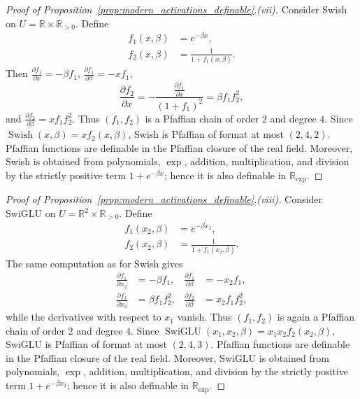 \documentclass{article}
\theoremstyle{plain}
\theoremstyle{definition}
\theoremstyle{remark}
\newcommand{\deriv}[2]{\frac{\partial #1}{\partial #2}}
\theoremstyle{plain}
\numberwithin{thm}{section}
\theoremstyle{definition}
\numberwithin{equation}{section}
\begin{document}
\begin{proof}[{Proof of Proposition~\ref{prop:modern_activations_definable}.(vii)}]
Consider Swish on $U=\mathbb{R}\times\mathbb{R}_{>0}$.  Define
\begin{align*}
    f_1(x,\beta)&=e^{-\beta x},\\
    f_2(x,\beta)&=\frac{1}{1+f_1(x,\beta)}.
\end{align*}
Then
$
    \deriv{f_1}{x}=-\beta f_1
$,
$
    \deriv{f_1}{\beta}=-x f_1
$,
$$
    \deriv{f_2}{x}
    =
        -\frac{\deriv{f_1}{x}}{(1+f_1)^2}
    =
        \beta f_1 f_2^2,
$$
and
$
    \deriv{f_2}{\beta}=x f_1 f_2^2
$.
Thus $(f_1,f_2)$ is a Pfaffian chain of order $2$ and degree $4$.  Since
$
    \operatorname{Swish}(x,\beta)=x f_2(x,\beta)
$,
Swish is Pfaffian of format at most $(2,4,2)$.  Pfaffian functions are definable in the Pfaffian closure of the real field.  Moreover, Swish is obtained from polynomials, $\exp$, addition, multiplication, and division by the strictly positive term $1+e^{-\beta x}$; hence it is also definable in $\mathbb{R}_{\exp}$.
\end{proof}



\begin{proof}[{Proof of Proposition~\ref{prop:modern_activations_definable}.(viii)}]
Consider SwiGLU on $U=\mathbb{R}^2\times\mathbb{R}_{>0}$.  Define
\begin{align*}
    f_1(x_2,\beta) &= e^{-\beta x_2},\\
    f_2(x_2,\beta) &= \frac{1}{1+f_1(x_2,\beta)}.
\end{align*}
The same computation as for Swish gives
\begin{align*}
    \frac{\partial f_1}{\partial x_2} &= -\beta f_1, &
    \frac{\partial f_1}{\partial \beta} &= -x_2 f_1,\\
    \frac{\partial f_2}{\partial x_2} &= \beta f_1 f_2^2, &
    \frac{\partial f_2}{\partial \beta} &= x_2 f_1 f_2^2,
\end{align*}
while the derivatives with respect to $x_1$ vanish.  Thus $(f_1,f_2)$ is again a Pfaffian chain of order $2$ and degree $4$.  Since
$
    \operatorname{SwiGLU}(x_1,x_2,\beta)
    =
        x_1x_2 f_2(x_2,\beta),
$
SwiGLU is Pfaffian of format at most $(2,4,3)$.  Pfaffian functions are definable in the Pfaffian closure of the real field.  Moreover, SwiGLU is obtained from polynomials, $\exp$, addition, multiplication, and division by the strictly positive term $1+e^{-\beta x_2}$; hence it is also definable in $\mathbb{R}_{\exp}$.
\end{proof}
\end{document}
